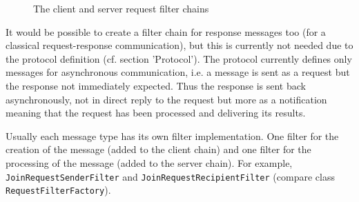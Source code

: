 \begin{figure}[H]
 \centering
 \caption{The client and server request filter chains}
 \label{fig:network.protocol.requestfilterchain}
\end{figure}

It would be possible to create a filter chain for response messages too (for a classical request-response communication), but this is currently not needed due to the protocol definition (cf. section 'Protocol'). The protocol currently defines only messages for asynchronous communication, i.e. a message is sent as a request but the response not immediately expected. Thus the response is sent back asynchronously, not in direct reply to the request but more as a notification meaning that the request has been processed and delivering its results.

Usually each message type has its own filter implementation. One filter for the creation of the message (added to the client chain) and one filter for the processing of the message (added to the server chain). For example, \texttt{JoinRequestSenderFilter} and \texttt{JoinRequestRecipientFilter} (compare class \texttt{RequestFilterFactory}).


